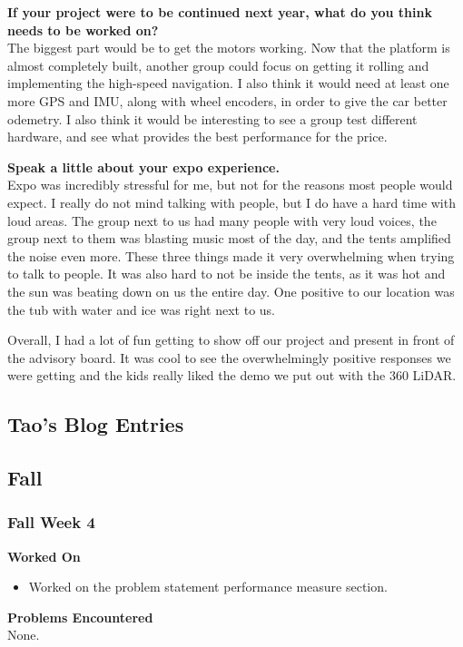 \documentclass[compsoc,draftclsnofoot,onecolumn,10pt]{IEEEtran}
\begin{document}
\textbf{If your project were to be continued next year, what do you think needs to be worked on?}\\
The biggest part would be to get the motors working. Now that the platform is almost completely built, another group could focus on getting it rolling and implementing the high-speed navigation. I also think it would need at least one more GPS and IMU, along with wheel encoders, in order to give the car better odemetry. I also think it would be interesting to see a group test different hardware, and see what provides the best performance for the price. 

\textbf{Speak a little about your expo experience.}\\
Expo was incredibly stressful for me, but not for the reasons most people would expect. I really do not mind talking with people, but I do have a hard time with loud areas. The group next to us had many people with very loud voices, the group next to them was blasting music most of the day, and the tents amplified the noise even more. These three things made it very overwhelming when trying to talk to people. It was also hard to not be inside the tents, as it was hot and the sun was beating down on us the entire day. One positive to our location was the tub with water and ice was right next to us. 

Overall,  I had a lot of fun getting to show off our project and present in front of the advisory board. It was cool to see the overwhelmingly positive responses we were getting and the kids really liked the demo we put out with the 360 LiDAR. \par



\subsection{Tao's Blog Entries}

\subsection{Fall}

\subsubsection*{Fall Week 4}
\textbf{Worked On}
\begin{itemize}
  \item Worked on the problem statement performance measure section.
\end{itemize}
\textbf{Problems Encountered}\\
None.
\end{document}

